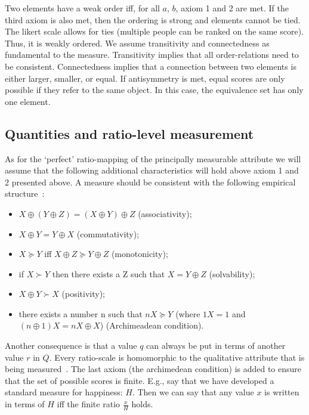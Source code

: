 \documentclass[titlepage, a4paper, 11pt]{article}
\begin{document}
Two elements have a weak order iff, for all $a$, $b$, axiom 1 and 2 are met. If the third axiom is also met, then the ordering is strong and elements cannot be tied. The likert scale allows for ties (multiple people can be ranked on the same score). Thus, it is weakly ordered. We assume transitivity and connectedness as fundamental to the measure. Transitivity implies that all order-relations need to be consistent. Connectedness implies that a connection between two elements is either larger, smaller, or equal. If antisymmetry is met, equal scores are only possible if they refer to the same object. In this case, the equivalence set has only one element.

\subsection{Quantities and ratio-level measurement}
As for the `perfect' ratio-mapping of the principally measurable attribute we will assume that the following additional characteristics will hold above axiom 1 and 2 presented above. A measure should be consistent with the following empirical structure~\citep{krantz_foundations_1971}:

\begin{itemize}
    \item $X \oplus (Y \oplus Z) = (X \oplus Y) \oplus Z$ (associativity);
    \item $X \oplus Y = Y \oplus X$ (commutativity);
    \item $X \succeq Y$ iff $X \oplus Z \succeq Y \oplus Z$ (monotonicity);
    \item if $X \succ Y$ then there exists a Z such that $X = Y \oplus Z$ (solvability);
    \item $X \oplus Y \succ X$ (positivity);
    \item there exists a number n such that $nX \succeq Y$ (where $1X = 1$ and $(n \oplus 1) X = nX \oplus X$) (Archimeadean condition).
\end{itemize}

Another consequence is that a value $q$ can always be put in terms of another value $r$ in $Q$. Every ratio-scale is homomorphic to the qualitative attribute that is being measured~\citep{michell_axioms_1997}. The last axiom (the archimedean condition) is added to ensure that the set of possible scores is finite. E.g., say that we have developed a standard measure for happiness: $H$. Then we can say that any value $x$ is written in terms of $H$ iff the finite ratio $\frac{x}{H}$ holds.
\end{document}
